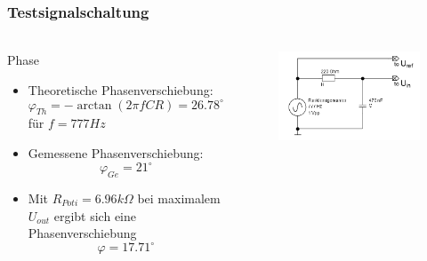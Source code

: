 \begin{frame}
\frametitle{Testsignalschaltung}
\framesubtitle{}
\begin{columns}[c]
         \begin{block}{Phase}
                 \begin{itemize}
                     \item Theoretische Phasenverschiebung:
                         \begin{equation*}
                             \varphi_{Th} = -\arctan{\left(2\pi f C R\right)} = 26.78^{\circ} 
                         \end{equation*}
                             für $f = 777Hz$
                    \item Gemessene Phasenverschiebung:
                        \begin{equation*}
                            \varphi_{Ge} = 21^{\circ}
                        \end{equation*}
                    \item
                        Mit $R_{Poti} = 6.96k\Omega$ bei maximalem $U_{out}$
                        ergibt sich eine Phasenverschiebung
                        \begin{equation*}
                            \varphi = 17.71^{\circ}
                        \end{equation*}
                 \end{itemize}
         \end{block}
        \begin{figure}[H]
        \begin{center}
                \includegraphics[scale=0.3]{./img/schaltung/testsignal.png}

\end{center}
\end{figure}
\end{columns}
\end{frame}
